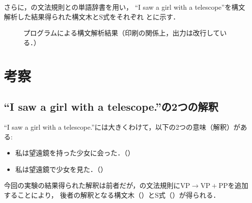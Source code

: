 \documentclass[uplatex, dvipdfmx, a4paper, twocolumn]{jsarticle}
\begin{document}
      さらに，の文法規則との単語辞書を用い，
      ``I saw a girl with a telescope''を構文解析した結果得られた構文木とS式をそれぞれ
      とに示す．
      \begin{figure}[htpb]
        \centering
        \caption{プログラムによる構文解析結果（印刷の関係上，出力は改行している．）}
        \label{fig:result_cyk}
      \end{figure}

  \section{考察}\label{kousatu}
    \subsection{``I saw a girl with a telescope.''の2つの解釈}
    ``I saw a girl with a telescope.''には大きくわけて，以下の2つの意味（解釈）がある:
    \begin{itemize}
      \item 私は望遠鏡を持った少女に会った．（）
      \item 私は望遠鏡で少女を見た．（）
    \end{itemize}
    今回の実験の結果得られた解釈は前者だが，の文法規則に\(\text{VP} \to \text{VP} + \text{PP}\)を追加することにより，
    後者の解釈となる構文木（）とS式（）が得られる．
\end{document}
